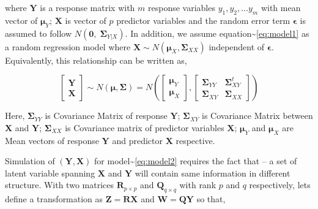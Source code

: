 \documentclass[12pt,A4paper,authoryear]{elsarticle} %
\begin{document}
where \(\mathbf{Y}\) is a response matrix with \(m\) response variables
\(y_1, y_2, \ldots y_m\) with mean vector of \(\boldsymbol{\mu}_Y\);
\(\mathbf{X}\) is vector of \(p\) predictor variables and the random
error term \(\boldsymbol{\epsilon}\) is assumed to follow
\(N(\boldsymbol{0},\; \boldsymbol{\Sigma}_{Y|X})\). In addition, we
assume equation\textasciitilde{}\eqref{eq:model1} as a random regression
model where
\(\mathbf{X} \sim N\left(\boldsymbol{\mu}_X, \boldsymbol{\Sigma}_{XX}\right)\)
independent of \(\boldsymbol{\epsilon}\). Equivalently, this
relationship can be written as,

\begin{equation}
  \begin{bmatrix}\mathbf{Y}\\ \mathbf{X}\end{bmatrix} \sim N(\boldsymbol{\mu}, \boldsymbol{\Sigma})
  = N \left(
    \begin{bmatrix}
      \boldsymbol{\mu}_Y \\
      \boldsymbol{\mu}_X
    \end{bmatrix},
    \begin{bmatrix}
      \boldsymbol{\Sigma}_{YY} & \boldsymbol{\Sigma}_{XY}^t \\
      \boldsymbol{\Sigma}_{XY} & \boldsymbol{\Sigma}_{XX}
    \end{bmatrix}
  \right)
  \label{eq:model2}
\end{equation}

Here, \(\boldsymbol{\Sigma}_{YY}\) is Covariance Matrix of response
\(\mathbf{Y}\); \(\boldsymbol{\Sigma}_{XY}\) is Covariance Matrix
between \(\mathbf{X}\) and \(\mathbf{Y}\); \(\boldsymbol{\Sigma}_{XX}\)
is Covariance matrix of predictor variables \(\mathbf{X}\);
\(\boldsymbol{\mu}_Y\) and \(\boldsymbol{\mu}_X\) are Mean vectors of
response \(\mathbf{Y}\) and predictor \(\mathbf{X}\) respective.

Simulation of \((\mathbf{Y, X})\) for
model\textasciitilde{}\eqref{eq:model2} requires the fact that -- a set of
latent variable spanning \(\mathbf{X}\) and \(\mathbf{Y}\) will contain
same information in different structure. With two matrices
\(\mathbf{R}_{p\times p}\) and \(\mathbf{Q}_{q \times q}\) with rank
\(p\) and \(q\) respectively, lets define a transformation as
\(\mathbf{Z} = \mathbf{RX}\) and \(\mathbf{W} = \mathbf{QY}\) so that,
\end{document}
